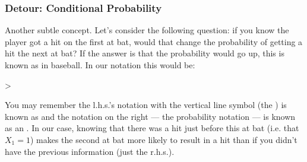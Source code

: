 \documentclass[slides]{beamer} %
\begin{document}
\begin{frame}
	\frametitle{Detour: Conditional Probability}

Another subtle concept. Let's consider the following question: if you know the player got a hit on the first at bat, would that change the probability of getting a hit the next at bat? \pause If the answer is that the probability would go up, this is known as  in baseball. \pause  In our notation this would be:

\beqn
{} > 
\eeqn

You may remember the l.h.s.'s notation with the vertical line symbol (the ) is known as  \pause and the notation on the right --- the  probability notation --- is known as an . \pause In our case, knowing that there was a hit just before this at bat (i.e. that $X_1 = 1$) makes the second at bat more likely to result in a hit than if you didn't have the previous information (just the r.h.s.).

\end{frame}
\end{document}
